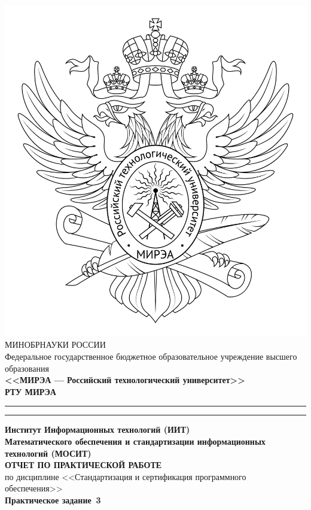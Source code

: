 \begin{titlepage}
	\thispagestyle{fancy}
	\renewcommand{\headrulewidth}{0pt}

	\centering
	\includegraphics[scale=0.5]{../res/logo} \break %
	МИНОБРНАУКИ РОССИИ\\
	Федеральное государственное бюджетное образовательное учреждение
	высшего образования\\
	\textbf{<<МИРЭА --- Российский технологический университет>>}\\
	\textbf{\large РТУ МИРЭА}\\
	\bigskip \hrule \smallskip \hrule \smallskip
	\textbf{Институт Информационных технологий (ИИТ)}\\
	\textbf{Математического обеспечения
		и стандартизации информационных технологий (МОСИТ)}\\
	\vfill
	\textbf{\large ОТЧЕТ ПО ПРАКТИЧЕСКОЙ РАБОТЕ}\\
	по дисциплине <<Стандартизация и сертификация программного обеспечения>>\\
	\vfill
	\textbf{\large Практическое задание \No\,3}\\
	\vfill
	\vfill
	\begin{tabular}{llr}

\end{tabular}
\end{titlepage}
